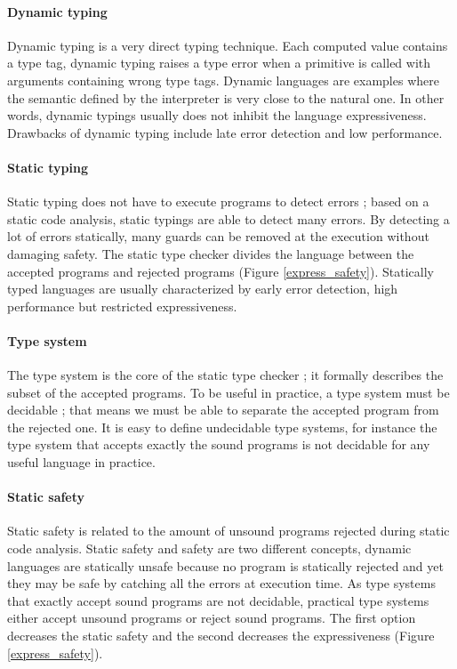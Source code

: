 \documentclass[a4paper]{report}
\newcommand{\reffig}[1]{(Figure \ref{#1})}
\begin{document}
\paragraph{Dynamic typing} Dynamic typing is a very direct typing technique. Each computed value contains a type tag, dynamic typing raises a type error when a primitive is called with arguments containing wrong type tags. Dynamic languages are examples where the semantic defined by the interpreter is very close to the natural one. In other words, dynamic typings usually does not inhibit the language expressiveness. Drawbacks of dynamic typing include late error detection and low performance.

\paragraph{Static typing} Static typing does not have to execute programs to detect errors ; based on a static code analysis, static typings are able to detect many errors. By detecting a lot of errors statically, many guards can be removed at the execution without damaging safety. The static type checker divides the language between the accepted programs and rejected programs \reffig{express_safety}. Statically typed languages are usually characterized by early error detection, high performance but restricted expressiveness.

\paragraph{Type system} The type system is the core of the static type checker ; it formally describes the subset of the accepted programs. To be useful in practice, a type system must be decidable ; that means we must be able to separate the accepted program from the rejected one. It is easy to define undecidable type systems, for instance the type system that accepts exactly the sound programs is not decidable for any useful language in practice.

\paragraph{Static safety} Static safety is related to the amount of unsound programs rejected during static code analysis. Static safety and safety are two different concepts, dynamic languages are statically unsafe because no program is statically rejected and yet they may be safe by catching all the errors at execution time. As type systems that exactly accept sound programs are not decidable, practical type systems either accept unsound programs or reject sound programs. The first option decreases the static safety and the second decreases the expressiveness \reffig{express_safety}. 
\end{document}
